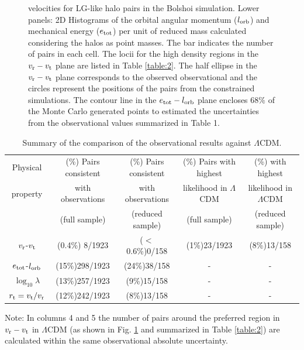 \documentclass{emulateapj}
\begin{document}
\begin{figure}
\begin{center}
{  velocities for LG-like halo pairs in the Bolshoi simulation.   Lower
  panels: 2D Histograms of the orbital angular momentum ($l_{\rm orb}$)
  and mechanical energy ($e_{\rm tot}$) per unit of reduced mass
  calculated considering the halos as point masses. The bar indicates
  the number of pairs in each cell. The locii for the high
  density regions in the $v_{\rm r}-v_{\rm t}$ plane are listed in
  Table \ref{table:2}. 
  The half ellipse in the $v_{\rm r}-v_{\rm t}$ plane corresponds to
  the observed observational and the circles represent the positions
  of the pairs from the constrained simulations. The contour line in
  the $e_{\rm tot}-l_{\rm orb}$ plane encloses $68\%$ of the Monte
  Carlo generated points to estimated the uncertainties from the
  observational values summarized in Table 1.}
\label{fig:rt}
\end{center}

\end{figure}


\begin{table}
\caption{Summary of the comparison of the observational results
  against $\Lambda$CDM.}
\begin{center}
\begin{tabular}{ccccc}\hline
Physical & (\%) Pairs consistent & (\%) Pairs consistent & (\%) Pairs
with highest & (\%) with highest\\ 
property & with observations & with observations & likelihood in
$\Lambda$CDM & likelihood in $\Lambda$CDM\\ 
 & (full sample) & (reduced sample) & (full sample) & (reduced sample)\\ \hline
$v_{\rm r}$-$v_{\rm t}$ & (0.4\%) 8/1923 & ($<$0.6\%)0/158 & (1\%)23/1923 & (8\%)13/158\\
$e_{\rm tot}$-$l_{\rm orb}$ & (15\%)298/1923 & (24\%)38/158 & - & -\\
$\log_{10}\lambda$ & (13\%)257/1923 & (9\%)15/158 & - & -\\
$r_{\rm t}=v_{\rm t}/v_{\rm r}$& (12\%)242/1923 & (8\%)13/158 & -& -\\\hline
\end{tabular}
\end{center}
\vspace{1mm}
Note: In columns 4 and 5 the number of pairs around the preferred region
in $v_{\rm r}-v_{\rm t}$ in $\Lambda$CDM (as shown in
Fig. \ref{fig:rt} and summarized in Table \ref{table:2}) are
calculated within the same observational absolute uncertainty.
\label{table:3}
\end{table}
\end{document}
